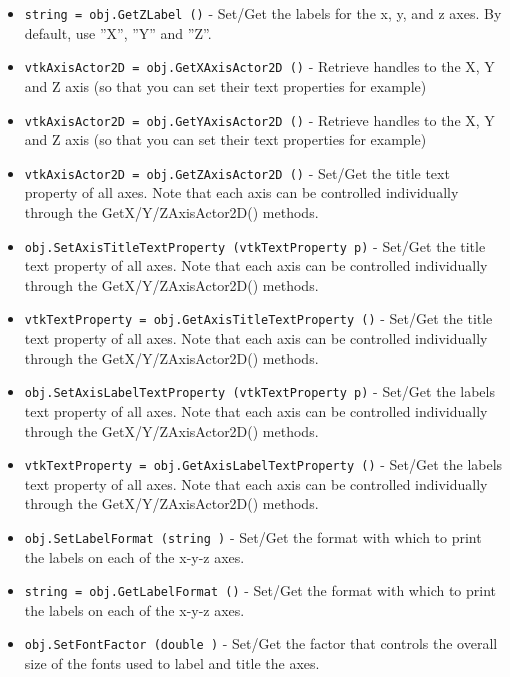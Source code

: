 \begin{itemize}
\item  \verb|string = obj.GetZLabel ()| -  Set/Get the labels for the x, y, and z axes. By default, 
 use ''X'', ''Y'' and ''Z''.

\item  \verb|vtkAxisActor2D = obj.GetXAxisActor2D ()| -  Retrieve handles to the X, Y and Z axis (so that you can set their text
 properties for example)

\item  \verb|vtkAxisActor2D = obj.GetYAxisActor2D ()| -  Retrieve handles to the X, Y and Z axis (so that you can set their text
 properties for example)

\item  \verb|vtkAxisActor2D = obj.GetZAxisActor2D ()| -  Set/Get the title text property of all axes. Note that each axis can
 be controlled individually through the GetX/Y/ZAxisActor2D() methods.

\item  \verb|obj.SetAxisTitleTextProperty (vtkTextProperty p)| -  Set/Get the title text property of all axes. Note that each axis can
 be controlled individually through the GetX/Y/ZAxisActor2D() methods.

\item  \verb|vtkTextProperty = obj.GetAxisTitleTextProperty ()| -  Set/Get the title text property of all axes. Note that each axis can
 be controlled individually through the GetX/Y/ZAxisActor2D() methods.

\item  \verb|obj.SetAxisLabelTextProperty (vtkTextProperty p)| -  Set/Get the labels text property of all axes. Note that each axis can
 be controlled individually through the GetX/Y/ZAxisActor2D() methods.

\item  \verb|vtkTextProperty = obj.GetAxisLabelTextProperty ()| -  Set/Get the labels text property of all axes. Note that each axis can
 be controlled individually through the GetX/Y/ZAxisActor2D() methods.

\item  \verb|obj.SetLabelFormat (string )| -  Set/Get the format with which to print the labels on each of the
 x-y-z axes.

\item  \verb|string = obj.GetLabelFormat ()| -  Set/Get the format with which to print the labels on each of the
 x-y-z axes.

\item  \verb|obj.SetFontFactor (double )| -  Set/Get the factor that controls the overall size of the fonts used
 to label and title the axes. 


\end{itemize}
